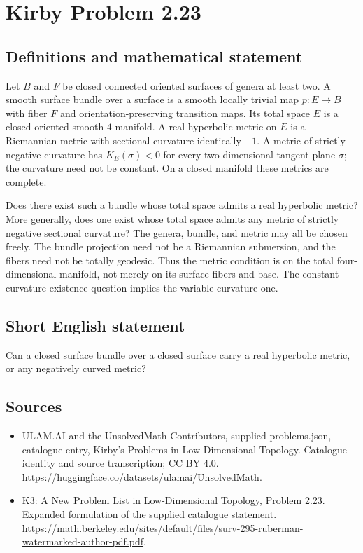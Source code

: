 \documentclass[11pt,a4paper]{article}
\begin{document}
\section*{Kirby Problem 2.23}\label{statement}

\subsection{Definitions and mathematical statement}
Let $B$ and $F$ be closed connected oriented surfaces of genera at least two.
A smooth surface bundle over a surface is a smooth locally trivial map
$p:E\to B$ with fiber $F$ and orientation-preserving transition maps. Its total
space $E$ is a closed oriented smooth $4$-manifold.
A real hyperbolic metric on $E$ is a Riemannian metric with sectional curvature
identically $-1$. A metric of strictly negative curvature has
$K_E(\sigma)<0$ for every two-dimensional tangent plane $\sigma$; the curvature
need not be constant. On a closed manifold these metrics are complete.

Does there exist such a bundle whose total space admits a real hyperbolic
metric? More generally, does one exist whose total space admits any metric
of strictly negative sectional curvature?
The genera, bundle, and metric may all be chosen freely. The bundle projection
need not be a Riemannian submersion, and the fibers need not be totally
geodesic. Thus the metric condition is on the total four-dimensional manifold,
not merely on its surface fibers and base. The constant-curvature existence
question implies the variable-curvature one.
\subsection{Short English statement}
Can a closed surface bundle over a closed surface carry a real hyperbolic metric, or any negatively curved metric?
\subsection{Sources}
\begin{itemize}
\item[S1] ULAM.AI and the UnsolvedMath Contributors, supplied problems.json, catalogue entry, Kirby's Problems in Low-Dimensional Topology. Catalogue identity and source transcription; CC BY 4.0.
\url{https://huggingface.co/datasets/ulamai/UnsolvedMath}.
\item[S2] K3: A New Problem List in Low-Dimensional Topology, Problem 2.23. Expanded formulation of the supplied catalogue statement.
\url{https://math.berkeley.edu/sites/default/files/surv-295-ruberman-watermarked-author-pdf.pdf}.
\end{itemize}
\end{document}
